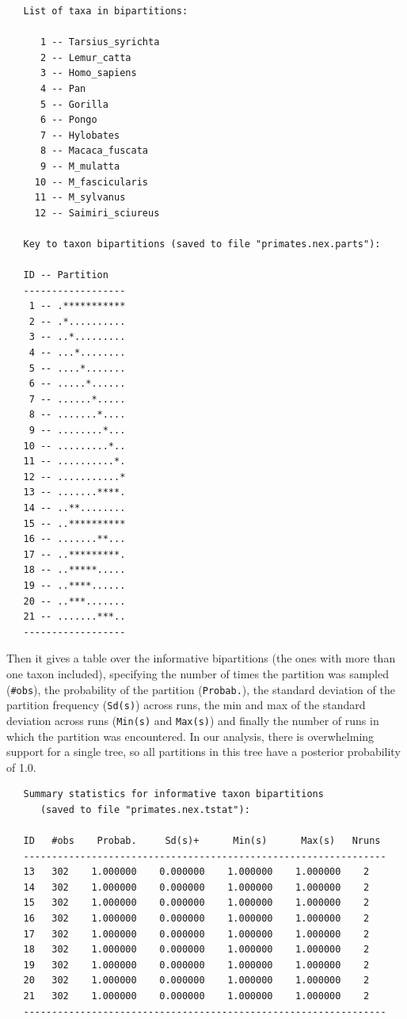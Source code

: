 \documentclass[12pt]{book}
\begin{document}
\begin{singlespacing}
\small
\begin{verbatim}
   List of taxa in bipartitions:                                                 
                                                                                   
      1 -- Tarsius_syrichta
      2 -- Lemur_catta
      3 -- Homo_sapiens
      4 -- Pan
      5 -- Gorilla
      6 -- Pongo
      7 -- Hylobates
      8 -- Macaca_fuscata
      9 -- M_mulatta
     10 -- M_fascicularis
     11 -- M_sylvanus
     12 -- Saimiri_sciureus

   Key to taxon bipartitions (saved to file "primates.nex.parts"):

   ID -- Partition
   ------------------
    1 -- .***********
    2 -- .*..........
    3 -- ..*.........
    4 -- ...*........
    5 -- ....*.......
    6 -- .....*......
    7 -- ......*.....
    8 -- .......*....
    9 -- ........*...
   10 -- .........*..
   11 -- ..........*.
   12 -- ...........*
   13 -- .......****.
   14 -- ..**........
   15 -- ..**********
   16 -- .......**...
   17 -- ..*********.
   18 -- ..*****.....
   19 -- ..****......
   20 -- ..***.......
   21 -- .......***..
   ------------------
\end{verbatim}
\normalsize
\end{singlespacing}

Then it gives a table over the informative bipartitions (the ones with more than one taxon included), 
specifying the number of times the partition was sampled (\texttt{\#obs}), the probability of the partition 
(\texttt{Probab.}), the standard deviation of the partition frequency (\texttt{Sd(s)}) across runs, the min 
and max of the standard deviation across runs (\texttt{Min(s)} and \texttt{Max(s)}) and finally the number 
of runs in which the partition was encountered. In our analysis, there is overwhelming support for a single 
tree, so all partitions in this tree have a posterior probability of 1.0.

\begin{singlespacing}
\small
\begin{verbatim}
   Summary statistics for informative taxon bipartitions
      (saved to file "primates.nex.tstat"):
   
   ID   #obs    Probab.     Sd(s)+      Min(s)      Max(s)   Nruns 
   ----------------------------------------------------------------
   13   302    1.000000    0.000000    1.000000    1.000000    2
   14   302    1.000000    0.000000    1.000000    1.000000    2
   15   302    1.000000    0.000000    1.000000    1.000000    2
   16   302    1.000000    0.000000    1.000000    1.000000    2
   17   302    1.000000    0.000000    1.000000    1.000000    2
   18   302    1.000000    0.000000    1.000000    1.000000    2
   19   302    1.000000    0.000000    1.000000    1.000000    2
   20   302    1.000000    0.000000    1.000000    1.000000    2
   21   302    1.000000    0.000000    1.000000    1.000000    2
   ----------------------------------------------------------------
\end{verbatim}
\normalsize
\end{singlespacing}
\end{document}
